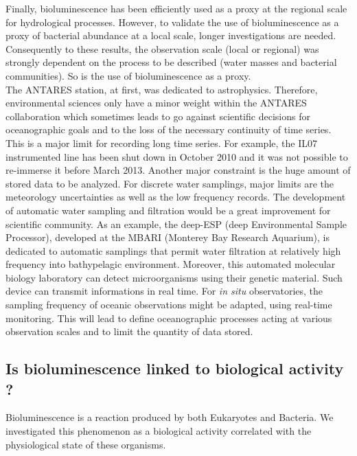 Finally, bioluminescence has been efficiently used as a proxy at the regional scale for hydrological processes. However, to validate the use of bioluminescence as a proxy of bacterial abundance at a local scale, longer investigations are needed. Consequently to these results, the observation scale (local or regional) was strongly dependent on the process to be described (water masses and bacterial communities). So is the use of bioluminescence as a proxy.\\

The ANTARES station, at first, was dedicated to astrophysics. Therefore, environmental sciences only have a minor weight within the ANTARES collaboration which sometimes leads to go against scientific decisions for oceanographic goals and to the loss of the necessary continuity of time series. This is a major limit for recording long time series. For example, the IL07 instrumented line has been shut down in October 2010 and it was not possible to re-immerse it before March 2013. Another major constraint is the huge amount of stored data to be analyzed. For discrete water samplings, major limits are the meteorology uncertainties as well as the low frequency records. The development of automatic water sampling and filtration would be a great improvement for scientific community. As an example, the deep-ESP (deep Environmental Sample Processor), developed at the MBARI (Monterey Bay Research Aquarium), is dedicated to automatic samplings that permit water filtration at relatively high frequency into bathypelagic environment. Moreover, this automated molecular biology laboratory can detect microorganisms using their genetic material. Such device can transmit informations in real time. For \textit{in situ} observatories, the sampling frequency of oceanic observations might be adapted, using real-time monitoring. This will lead to define oceanographic processes acting at various observation scales and to limit the quantity of data stored.\\

\subsection{Is bioluminescence linked to biological activity ?}

Bioluminescence is a reaction produced by both Eukaryotes and Bacteria. We investigated this phenomenon as a biological activity correlated with the physiological state of these organisms.\\

